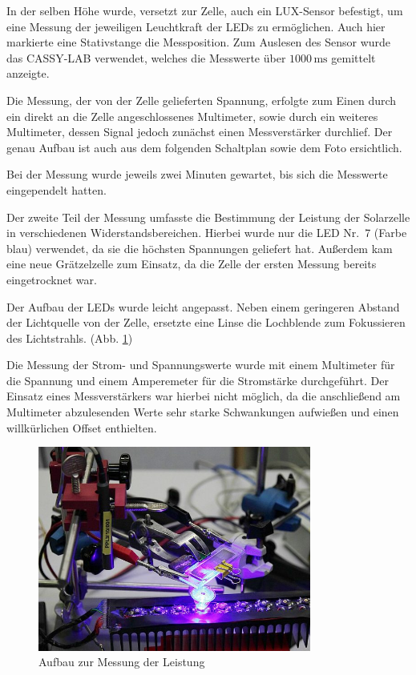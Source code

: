 \documentclass[11pt]{scrartcl}
\newcommand{\unit}[1]{\ensuremath{\,\mathrm{#1}}} %
\begin{document}
In der selben H\"ohe wurde, versetzt zur Zelle, auch ein LUX-Sensor befestigt, um eine Messung der jeweiligen Leuchtkraft der LEDs zu erm\"oglichen. Auch hier markierte eine Stativstange die Messposition. Zum Auslesen des Sensor wurde das CASSY-LAB verwendet, welches die Messwerte \"uber $1000\unit{ms}$ gemittelt anzeigte.

Die Messung, der von der Zelle gelieferten Spannung, erfolgte zum Einen durch ein direkt an die Zelle angeschlossenes Multimeter, sowie durch ein weiteres Multimeter, dessen Signal jedoch zun\"achst einen Messverst\"arker durchlief. Der genau Aufbau ist auch aus dem folgenden Schaltplan sowie dem Foto ersichtlich.


Bei der Messung wurde jeweils zwei Minuten gewartet, bis sich die Messwerte eingependelt hatten.

Der zweite Teil der Messung umfasste die Bestimmung der Leistung der Solarzelle in verschiedenen Widerstandsbereichen. Hierbei wurde nur die LED Nr.~7 (Farbe blau) verwendet, da sie die h\"ochsten Spannungen geliefert hat. Au\ss{}erdem kam eine neue Gr\"atzelzelle zum Einsatz, da die Zelle der ersten Messung bereits eingetrocknet war.

Der Aufbau der LEDs wurde leicht angepasst. Neben einem geringeren Abstand der Lichtquelle von der Zelle, ersetzte eine Linse die Lochblende zum Fokussieren des Lichtstrahls. (Abb. \ref{messung_leistung})

Die Messung der Strom- und Spannungswerte wurde mit einem Multimeter f\"ur die Spannung und einem Amperemeter f\"ur die Stromst\"arke durchgef\"uhrt. Der Einsatz eines Messverst\"arkers war hierbei nicht m\"oglich, da die anschlie\ss{}end am Multimeter abzulesenden Werte sehr starke Schwankungen aufwie\ss{}en und einen willkürlichen Offset enthielten.

\begin{figure}[ht]
\begin{center}
\includegraphics[width=0.8\textwidth]{images/messung_leistung.jpg}
\end{center}
\vspace{-1.5\baselineskip}
\caption{Aufbau zur Messung der Leistung}
\label{messung_leistung}
\end{figure}
\end{document}
